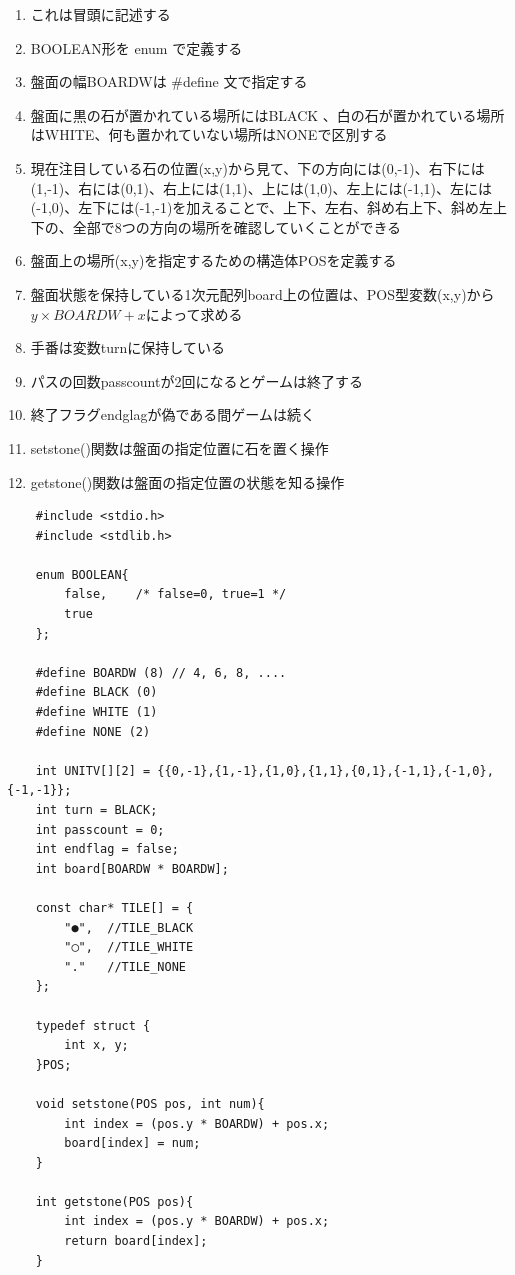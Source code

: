 \documentclass[uplatex,a4paper,11pt,oneside,openany]{jsbook}
\begin{document}
\begin{enumerate}
	\item これは冒頭に記述する
	\item BOOLEAN形を enum で定義する
	\item 盤面の幅BOARDWは \#define 文で指定する
	\item 盤面に黒の石が置かれている場所にはBLACK 、白の石が置かれている場所はWHITE、何も置かれていない場所はNONEで区別する
	\item 現在注目している石の位置(x,y)から見て、下の方向には(0,-1)、右下には(1,-1)、右には(0,1)、右上には(1,1)、上には(1,0)、左上には(-1,1)、左には(-1,0)、左下には(-1,-1)を加えることで、上下、左右、斜め右上下、斜め左上下の、全部で8つの方向の場所を確認していくことができる
	\item 盤面上の場所(x,y)を指定するための構造体POSを定義する
	\item 盤面状態を保持している1次元配列board上の位置は、POS型変数(x,y)から\\$y \times BOARDW +x$によって求める
	\item 手番は変数turnに保持している
	\item パスの回数passcountが2回になるとゲームは終了する
	\item 終了フラグendglagが偽である間ゲームは続く
	\item setstone()関数は盤面の指定位置に石を置く操作
	\item getstone()関数は盤面の指定位置の状態を知る操作
\end{enumerate}

\begin{lstlisting}
	#include <stdio.h>
	#include <stdlib.h>
	
	enum BOOLEAN{
		false,    /* false=0, true=1 */
		true
	};
	
	#define BOARDW (8) // 4, 6, 8, ....
	#define BLACK (0)
	#define WHITE (1)
	#define NONE (2)
	
	int UNITV[][2] = {{0,-1},{1,-1},{1,0},{1,1},{0,1},{-1,1},{-1,0},{-1,-1}};
	int turn = BLACK;
	int passcount = 0;
	int endflag = false;
	int board[BOARDW * BOARDW];
	
	const char* TILE[] = {
		"●",  //TILE_BLACK
		"◯",  //TILE_WHITE
		"."   //TILE_NONE
	};
	
	typedef struct {
		int x, y;
	}POS;
	
	void setstone(POS pos, int num){
		int index = (pos.y * BOARDW) + pos.x;
		board[index] = num;
	}
	
	int getstone(POS pos){
		int index = (pos.y * BOARDW) + pos.x;
		return board[index];
	}
\end{lstlisting}
\end{document}
